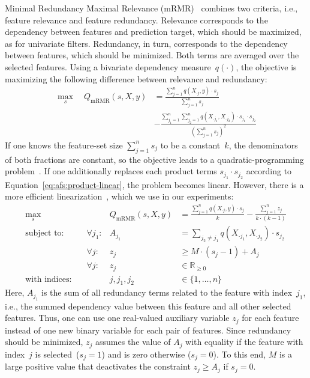 \documentclass{article}
\theoremstyle{definition}
\begin{document}
Minimal Redundancy Maximal Relevance (mRMR)~\cite{peng2005feature} combines two criteria, i.e., feature relevance and feature redundancy.
Relevance corresponds to the dependency between features and prediction target, which should be maximized, as for univariate filters.
Redundancy, in turn, corresponds to the dependency between features, which should be minimized.
Both terms are averaged over the selected features.
Using a bivariate dependency measure~$q(\cdot)$, the objective is maximizing the following difference between relevance and redundancy:
%
\begin{equation}
	\begin{aligned}
		\max_s \quad Q_{\text{mRMR}}(s,X,y) &= \frac{\sum_{j=1}^{n} q(X_{\cdot{}j},y) \cdot s_j}{\sum_{j=1}^{n} s_j} \\
		&- \frac{\sum_{j_1=1}^{n} \sum_{j_2=1}^{n} q(X_{\cdot{}j_1}, X_{\cdot{}j_2}) \cdot s_{j_1} \cdot s_{j_2}}{(\sum_{j=1}^{n} s_j)^2}
	\end{aligned}
	\label{eq:afs:mrmr}
\end{equation}
%
If one knows the feature-set size $\sum_{j=1}^{n} s_j$ to be a constant~$k$, the denominators of both fractions are constant, so the objective leads to a quadratic-programming problem~\cite{nguyen2014effective, rodriguez2010quadratic}.
If one additionally replaces each product terms $s_{j_1} \cdot s_{j_2}$ according to Equation~\ref{eq:afs:product-linear}, the problem becomes linear.
However, there is a more efficient linearization~\cite{nguyen2009optimizing, nguyen2010towards}, which we use in our experiments:
%
\begin{equation}
	\begin{aligned}
		\max_s &\quad & Q_{\text{mRMR}}(s,X,y) &= \frac{\sum_{j=1}^{n} q(X_{\cdot{}j},y) \cdot s_j}{k} - \frac{\sum_{j=1}^{n} z_j}{k \cdot (k-1)} \\
		\text{subject to:} &\quad \forall j_1: & A_{j_1} &= \sum_{j_2 \neq j_1} q(X_{\cdot{}j_1}, X_{\cdot{}j_2}) \cdot s_{j_2} \\
		&\quad \forall j: & z_j &\geq M \cdot (s_j - 1) + A_j \\
		&\quad \forall j: & z_j &\in \mathbb{R}_{\geq 0} \\
		\text{with indices:} &\quad & j, j_1, j_2 &\in \{1, \dots, n\}
	\end{aligned}
	\label{eq:afs:mrmr-linear}
\end{equation}
%
Here, $A_{j_1}$ is the sum of all redundancy terms related to the feature with index~$j_1$, i.e., the summed dependency value between this feature and all other selected features.
Thus, one can use one real-valued auxiliary variable $z_j$ for each feature instead of one new binary variable for each pair of features.
Since redundancy should be minimized, $z_j$ assumes the value of $A_j$ with equality if the feature with index~$j$ is selected~($s_j=1$) and is zero otherwise ($s_j=0$).
To this end, $M$ is a large positive value that deactivates the constraint $z_j \geq A_j$ if $s_j=0$.
\end{document}
